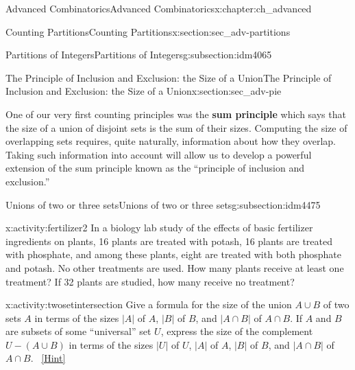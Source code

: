 \documentclass[oneside,10pt,]{book}
\newcommand{\terminology}[1]{\textbf{#1}}
\numberwithin{equation}{chapter}
\begin{document}
\begin{chapterptx}{Advanced Combinatorics}{}{Advanced Combinatorics}{}{}{x:chapter:ch_advanced}
\begin{sectionptx}{Counting Partitions}{}{Counting Partitions}{}{}{x:section:sec_adv-partitions}
\begin{subsectionptx}{Partitions of Integers}{}{Partitions of Integers}{}{}{g:subsection:idm4065}
\end{subsectionptx}
\end{sectionptx}
%
%
\typeout{************************************************}
\typeout{************************************************}
%
\begin{sectionptx}{The Principle of Inclusion and Exclusion: the Size of a Union}{}{The Principle of Inclusion and Exclusion: the Size of a Union}{}{}{x:section:sec_adv-pie}
\begin{introduction}{}%
One of our very first counting principles was the \terminology{sum principle} which says that the size of a union of disjoint sets is the sum of their sizes. Computing the size of overlapping sets requires, quite naturally, information about how they overlap. Taking such information into account will allow us to develop a powerful extension of the sum principle known as the ``principle of inclusion and exclusion.''%
\end{introduction}%
%
%
\typeout{************************************************}
\typeout{************************************************}
%
\begin{subsectionptx}{Unions of two or three sets}{}{Unions of two or three sets}{}{}{g:subsection:idm4475}
\begin{activity}{}{x:activity:fertilizer2}%
In a biology lab study of the effects of basic fertilizer ingredients on plants, 16 plants are treated with potash, 16 plants are treated with phosphate, and among these plants, eight are treated with both phosphate and potash. No other treatments are used. How many plants receive at least one treatment? If 32 plants are studied, how many receive no treatment?%
\end{activity}
\begin{activity}{}{x:activity:twosetintersection}%
Give a formula for the size of the union \(A\cup B\) of two sets \(A\) in terms of the sizes \(|A|\) of \(A\), \(|B|\) of \(B\), and \(|A\cap B|\) of \(A\cap B\). If \(A\) and \(B\) are subsets of some ``universal'' set \(U\), express the size of the complement \(U-(A\cup B)\) in terms of the sizes \(|U|\) of \(U\), \(|A|\) of \(A\), \(|B|\) of \(B\), and \(|A\cap B|\) of \(A\cap B\).%
\qquad~\hfill{\tiny\hyperlink{g:hint:idm4507-back}{[Hint]}}\end{activity}

\end{subsectionptx}
\end{sectionptx}
\end{chapterptx}
\end{document}
